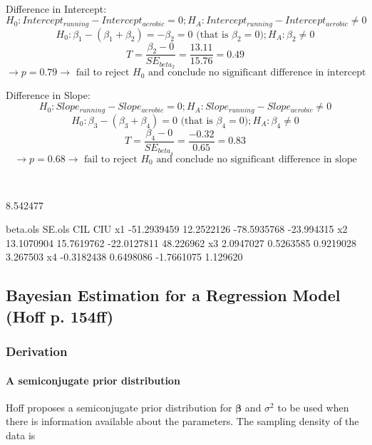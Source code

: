 \documentclass[12pt, a4paper]{article}
\begin{document}
\hrulefill \\

Difference in Intercept:\\
$$H_0:  Intercept_{running} - Intercept_{aerobic} = 0; H_A:  Intercept_{running} - Intercept_{aerobic} \ne 0$$
$$H_0:  \beta_1 - (\beta_1 + \beta_2) = -\beta_2 = 0 \text{ (that is } \beta_2 = 0); H_A:  \beta_2 \ne 0$$
$$T = \frac{\beta_2 - 0}{SE_{beta_2}} = \frac{13.11}{15.76} = 0.49$$
$$\longrightarrow p = 0.79\longrightarrow \text{ fail to reject } H_0 \text{ and conclude no significant difference in intercept}$$

Difference in Slope:\\
$$H_0:  Slope_{running} - Slope_{aerobic} = 0; H_A:  Slope_{running} - Slope_{aerobic} \ne 0$$
$$H_0:  \beta_3 - (\beta_3 + \beta_4) = 0 \text{ (that is } \beta_4 = 0); H_A:  \beta_4 \ne 0$$
$$T = \frac{\beta_4 - 0}{SE_{beta_4}} = \frac{-0.32}{0.65} = 0.83$$
$$\longrightarrow p = 0.68\longrightarrow \text{ fail to reject } H_0 \text{ and conclude no significant difference in slope}$$


\hrulefill \\

\begin{Schunk}
\begin{Soutput}
[1] 8.542477
\end{Soutput}
\begin{Soutput}
      beta.ols     SE.ols         CIL        CIU
x1 -51.2939459 12.2522126 -78.5935768 -23.994315
x2  13.1070904 15.7619762 -22.0127811  48.226962
x3   2.0947027  0.5263585   0.9219028   3.267503
x4  -0.3182438  0.6498086  -1.7661075   1.129620
\end{Soutput}
\end{Schunk}



\clearpage

  \subsection{Bayesian Estimation for a Regression Model (Hoff p. 154ff)}

  \subsubsection{Derivation}

    \paragraph{A semiconjugate prior distribution}\label{normRegSemiconjugatePrior}
    Hoff proposes a semiconjugate prior distribution for $\boldsymbol\beta$ and $\sigma^2$ to be used when there is information available about the parameters.  The sampling density of the data is
\end{document}
